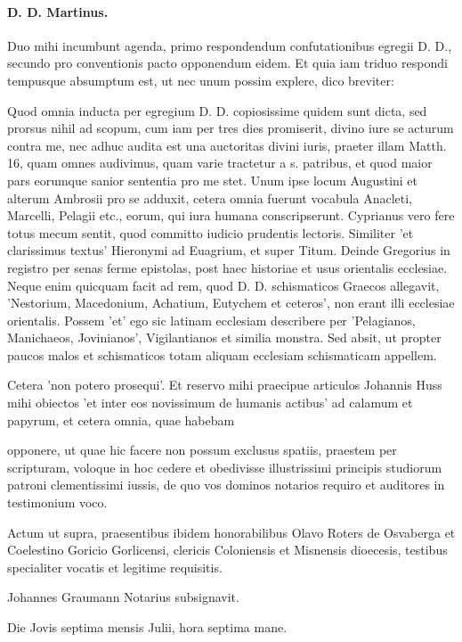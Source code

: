 \paragraph*{D. D. Martinus.}

Duo mihi incumbunt agenda, primo respondendum confutationibus egregii D. D., secundo pro conventionis pacto opponendum eidem. Et quia iam triduo respondi tempusque absumptum est, ut nec unum possim explere, dico breviter:

Quod omnia inducta per egregium D. D. copiosissime quidem sunt dicta, sed prorsus nihil ad scopum, cum iam per tres dies promiserit, divino iure se acturum contra me, nec adhuc audita est una auctoritas divini iuris, praeter illam Matth. 16, quam omnes audivimus, quam varie tractetur a s. patribus, et quod maior pars eorumque sanior sententia pro me stet. Unum ipse locum Augustini et alterum Ambrosii pro se adduxit, cetera omnia fuerunt vocabula Anacleti, Marcelli, Pelagii etc., eorum, qui iura humana conscripserunt. Cyprianus vero fere totus mecum sentit, quod committo iudicio prudentis lectoris. Similiter 'et clarissimus textus' Hieronymi ad Euagrium, et super Titum. Deinde Gregorius in registro per senas ferme epistolas, post haec historiae et usus orientalis ecclesiae. Neque enim quicquam facit ad rem, quod D. D. schismaticos Graecos allegavit, 'Nestorium, Macedonium, Achatium, Eutychem et ceteros', non erant illi ecclesiae orientalis. Possem 'et' ego sic latinam ecclesiam describere per 'Pelagianos, Manichaeos, Jovinianos', Vigilantianos et similia monstra. Sed absit, ut propter paucos malos et schismaticos totam aliquam ecclesiam schismaticam appellem.

Cetera 'non potero prosequi'. Et reservo mihi praecipue articulos Johannis Huss mihi obiectos 'et inter eos novissimum de humanis actibus' ad calamum et papyrum, et cetera omnia, quae habebam

opponere, ut quae hic facere non possum exclusus spatiis, praestem per scripturam, voloque in hoc cedere et obedivisse illustrissimi principis studiorum patroni clementissimi iussis, de quo vos dominos notarios requiro et auditores in testimonium voco.

Actum ut supra, praesentibus ibidem honorabilibus Olavo Roters de Osvaberga et Coelestino Goricio Gorlicensi, clericis Coloniensis et Misnensis dioecesis, testibus specialiter vocatis et legitime requisitis.

Johannes Graumann Notarius subsignavit.

\marginpar{\small[298]} Die Jovis septima mensis Julii, hora septima mane.

